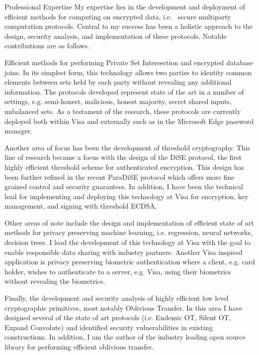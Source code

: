 \documentclass{resume} %
\begin{document}

\begin{rSection}{Professional Expertise}
	My expertise lies in the development and deployment of efficient methods for computing on encrypted data, i.e.  secure multiparty computation protocols. Central to my success has been a holistic approach to the design, security analysis, and implementation of these protocols. Notable contributions are as follows.
	
	Efficient methods for performing Private Set Intersection and encrypted database joins. In its simplest form, this technology allows two parties to identity common elements between sets held by each party without revealing any additional information. The protocols developed represent state of the art in a number of settings, e.g. semi-honest, malicious, honest majority, secret shared inputs, unbalanced sets. As a testament of the research, these protocols are currently deployed both within Visa and externally such as in the Microsoft Edge password manager.
	
	Another area of focus has been the development of threshold cryptography. This line of research became a focus with the design of the DiSE protocol, the first highly efficient threshold scheme for authenticated encryption. This design has been further refined in the recent ParaDiSE protocol which offers more fine grained control and security guarantees. In addition, I have been the technical lead for implementing and deploying this technology at Visa for encryption, key management, and signing with threshold ECDSA.
	
	Other areas of note include the design and implementation of efficient state of art methods for privacy preserving machine learning, i.e. regression, neural networks, decision trees. I lead the development of this technology at Visa with the goal to enable responsible data sharing with industry partners. Another Visa inspired application is privacy preserving biometric authentication where a client, e.g. card holder, wishes to authenticate to a server, e.g. Visa, using their biometrics without revealing the biometrics.
	
	Finally, the development and security analysis of highly efficient low level cryptographic primitives, most notably Oblivious Transfer. In this area I have designed several of the state of art protocols (i.e. Endemic OT, Silent OT, Expand Convolute) and identified security vulnerabilities in existing constructions. In addition, I am the author of the industry leading open source library for performing efficient oblivious transfer.


\end{rSection}
\end{document}
